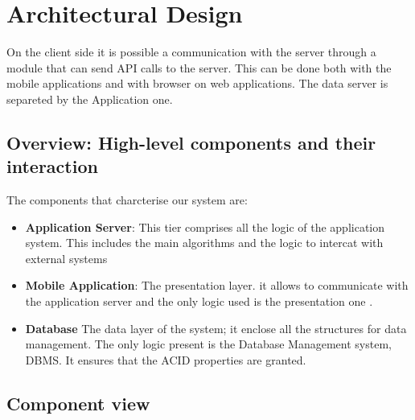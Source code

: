 \documentclass[a4paper]{article}
\begin{document}
\newpage

\section{Architectural Design}



On the client side it is possible a communication with the server through a module that can send API calls to the server. This can be done both with the mobile applications and with browser on web applications.
The data server is separeted by the Application one.




\subsection{Overview: High-level components and their interaction}

The components that charcterise our system are:

\begin{itemize}
    \item \textbf{Application Server}: This tier comprises all the logic of the application system. This includes the main algorithms and the logic to intercat with external systems
    
    \item \textbf{Mobile Application}: The presentation layer.
it allows to communicate with the application server and the only logic used is the presentation one .

   \item \textbf{Database} The data layer of the system; it enclose all the structures for data management. The only logic present is the Database Management system, DBMS. It ensures that the ACID properties are granted.
\end{itemize}



\subsection{Component view}
\end{document}
